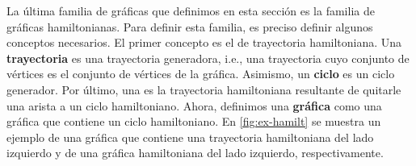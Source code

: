 \newpage

La \'ultima familia de gr\'aficas que definimos en esta secci\'on es la familia
de gr\'aficas hamiltonianas. Para definir esta familia, es preciso definir
algunos conceptos necesarios. El primer concepto es el de trayectoria
hamiltoniana. Una \textbf{trayectoria}
 es una
trayectoria generadora, i.e., una trayectoria cuyo conjunto de v\'ertices es el
conjunto de v\'ertices de la gr\'afica. Asimismo, un \textbf{ciclo}
 es un ciclo generador.
Por \'ultimo, una  es la trayectoria hamiltoniana
resultante de quitarle una arista a un ciclo hamiltoniano. Ahora, definimos una
\textbf{gr\'afica}
 como una
gr\'afica que contiene un ciclo hamiltoniano. En \cref{fig:ex-hamilt} se muestra
un ejemplo de una gr\'afica que contiene una trayectoria hamiltoniana del lado
izquierdo y de una gr\'afica hamiltoniana del lado izquierdo, respectivamente.

